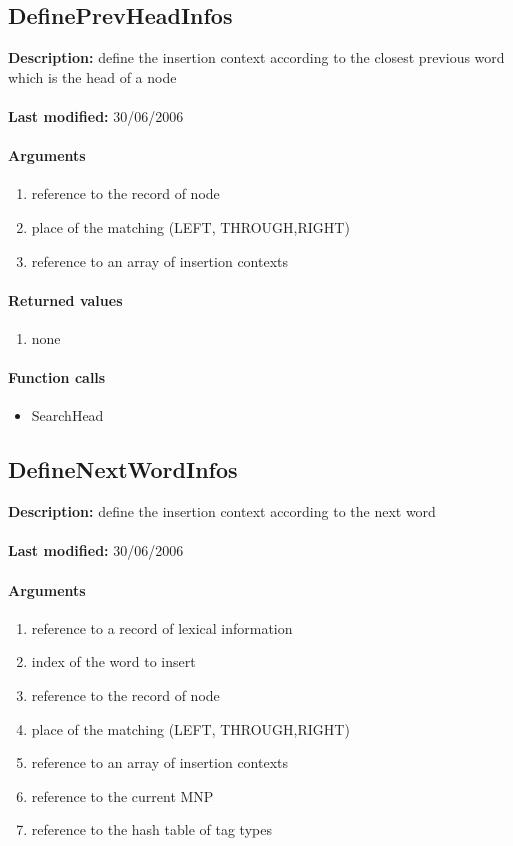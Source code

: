 \subsection{DefinePrevHeadInfos}
\textbf{Description:} define the insertion context according to the closest previous word which is the head of a node\\
\\\textbf{Last modified:} 30/06/2006

\paragraph{Arguments}
\begin{enumerate}
\item reference to the record of node
\item place of the matching (LEFT, THROUGH,RIGHT)
\item reference to an array of insertion contexts
\end{enumerate}

\paragraph{Returned values}
\begin{enumerate}
\item none
\end{enumerate}

\paragraph{Function calls}
\begin{itemize}
\item SearchHead
\end{itemize}

\subsection{DefineNextWordInfos}
\textbf{Description:} define the insertion context according to the next word\\
\\\textbf{Last modified:} 30/06/2006

\paragraph{Arguments}
\begin{enumerate}
\item reference to a record of lexical information
\item index of the word to insert
\item reference to the record of node
\item place of the matching (LEFT, THROUGH,RIGHT)
\item reference to an array of insertion contexts
\item reference to the current MNP
\item reference to the hash table of tag types
\end{enumerate}

